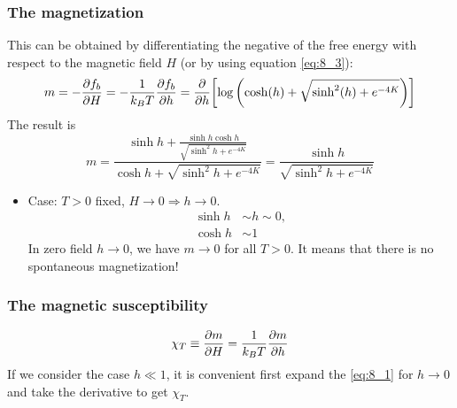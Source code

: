 \documentclass[../main/main.tex]{subfiles}
\begin{document}
\subsubsection{The magnetization}
This can be obtained by differentiating the negative of the free energy with respect to the magnetic field \( H \) (or by using equation \eqref{eq:8_3}):
\begin{equation*}
  m = - \pdv{f_b}{H} = - \frac{1}{k_B T } \pdv{f_b}{h} = \pdv{}{h} \qty[  \log{\qty( \cosh(h)+\sqrt{\sinh^2(h)+e^{-4K}  } )} ]
\end{equation*}
The result is
\begin{equation}
  m =   \frac{\sinh h + \frac{ \sinh h \cosh h}{\sqrt{\sinh^2 h + e^{-4K} }} }{\cosh h + \sqrt{\sinh^2 h + e^{-4K} } } 
  = \frac{\sinh h  }{\sqrt{\sinh^2 h + e^{-4K} } }
  \label{eq:8_1}
\end{equation}
\begin{itemize}
\item Case: \( T>0 \) fixed, \( H \rightarrow 0 \Rightarrow h \rightarrow 0\).
\begin{subequations}
\begin{align*}
  \sinh h & \sim h \sim 0, \\ \cosh h &\sim 1
\end{align*}
\end{subequations}
In zero field \( h \rightarrow 0 \), we have \( m \rightarrow 0 \) for all \( T>0 \). It means that there is no spontaneous magnetization!
\end{itemize}


\subsubsection{The magnetic susceptibility}
\begin{equation}
  \chi_T  \equiv  \pdv{m}{H} = \frac{1}{k_B T} \pdv{m}{h}
\end{equation}
If we consider the case \( h \ll 1 \), it is convenient first expand the  \eqref{eq:8_1} for \( h \rightarrow 0 \) and take the derivative to get \( \chi _T \).
\end{document}
